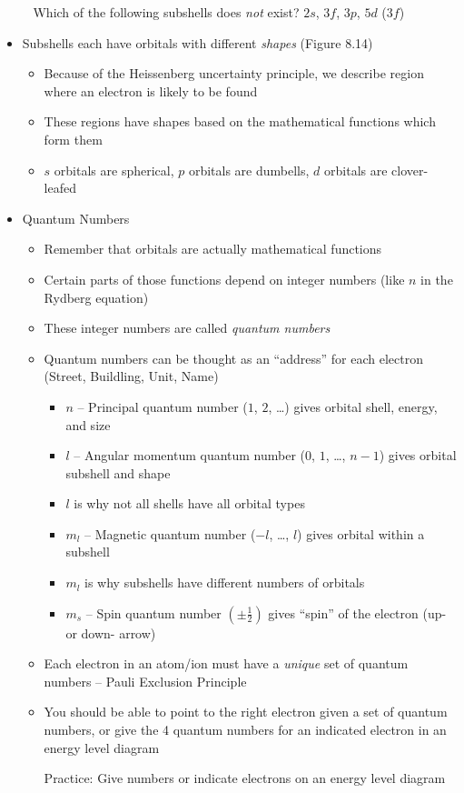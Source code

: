 \documentclass[12pt, openany, letterpaper]{memoir}
\begin{document}
\begin{itemize}
	      ~\hphantom{Practice:} Which of the following subshells does \emph{not} exist? $2s$, $3f$, $3p$, $5d$ ($3f$)
	\item Subshells each have orbitals with different \emph{shapes} (Figure 8.14)
	      \begin{itemize}
		      \item Because of the Heissenberg uncertainty principle, we describe region where an electron is likely to be found
		      \item These regions have shapes based on the mathematical functions which form them
		      \item $s$ orbitals are spherical, $p$ orbitals are dumbells, $d$ orbitals are clover-leafed
	      \end{itemize}
  \item Quantum Numbers
    \begin{itemize}
      \item Remember that orbitals are actually mathematical functions
      \item Certain parts of those functions depend on integer numbers (like $n$ in the Rydberg equation)
      \item These integer numbers are called \emph{quantum numbers}
      \item Quantum numbers can be thought as an ``address'' for each electron (Street, Buildling, Unit, Name)
            \begin{itemize}
              \item $n$ -- Principal quantum number ($1$, $2$, \ldots) gives orbital shell, energy, and size
              \item $l$ -- Angular momentum quantum number ($0$, $1$, \ldots, $n-1$) gives orbital subshell and shape
              \item $l$ is why not all shells have all orbital types
              \item $m_l$ -- Magnetic quantum number ($-l$, \ldots, $l$) gives orbital within a subshell
              \item $m_l$ is why subshells have different numbers of orbitals
              \item $m_s$ -- Spin quantum number $\left(\pm \frac{1}{2}\right)$ gives ``spin'' of the electron (up- or down- arrow)
            \end{itemize}
      \item Each electron in an atom/ion must have a \emph{unique} set of quantum numbers -- Pauli Exclusion Principle
      \item You should be able to point to the right electron given a set of quantum numbers, or give the 4 quantum numbers for an indicated electron in an energy level diagram

            Practice: Give numbers or indicate electrons on an energy level diagram
    \end{itemize}
\end{itemize}
\end{document}
